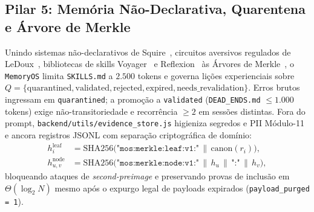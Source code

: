 \documentclass[10pt,twocolumn]{article}
\begin{document}
\subsection{Pilar 5: Mem\'oria N\~ao-Declarativa, Quarentena e \'Arvore de Merkle}
Unindo sistemas n\~ao-declarativos de Squire~\cite{E15}, circuitos aversivos regulados de LeDoux~\cite{E16}, bibliotecas de skills Voyager~\cite{E17} e Reflexion~\cite{E18} \`as \'Arvores de Merkle~\cite{E19}, o \texttt{MemoryOS} limita \texttt{SKILLS.md} a $2.500$ tokens e governa li\c{c}\~oes experienciais sobre $Q = \{\text{quarantined}, \text{validated}, \text{rejected}, \text{expired}, \text{needs\_revalidation}\}$. Erros brutos ingressam em \texttt{quarantined}; a promo\c{c}\~ao a \texttt{validated} (\texttt{DEAD\_ENDS.md} $\le 1.000$ tokens) exige n\~ao-transitoriedade e recorr\^encia $\ge 2$ em sess\~oes distintas. Fora do prompt, \texttt{backend/utils/evidence\_store.js} higieniza segredos e PII M\'odulo-11~\cite{N01} e ancora registros JSONL com separa\c{c}\~ao criptogr\'afica de dom\'inio:
\begin{align}
h_i^{\mathrm{leaf}} &= \mathrm{SHA256}\bigl(\texttt{"mos:merkle:leaf:v1:"} \,\|\, \mathrm{canon}(r_i)\bigr), \\
h_{u,v}^{\mathrm{node}} &= \mathrm{SHA256}\bigl(\texttt{"mos:merkle:node:v1:"} \,\|\, h_u \,\|\, \texttt{":"} \,\|\, h_v\bigr),
\end{align}
bloqueando ataques de \emph{second-preimage} e preservando provas de inclus\~ao em $\Theta(\log_2 N)$ mesmo ap\'os o expurgo legal de payloads expirados (\texttt{payload\_purged = 1}).
\end{document}
